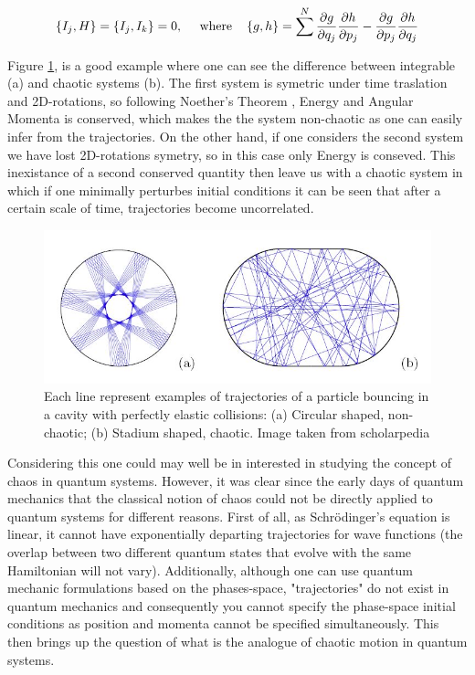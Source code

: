 \documentclass[11pt,a4paper]{article}
\begin{document}
\begin{equation}
    \left\{I_j,H\right\}=\left\{I_j,I_k\right\} = 0, ~~~~\text{where}~~~\left\{g,h\right\} = \sum^N\frac{\partial g}{\partial q_j}\frac{\partial h}{\partial p_j} - \frac{\partial g}{\partial p_j}\frac{\partial h}{\partial q_j}
\end{equation}

Figure \ref{Example_Chaos}, is a good example where one can see the difference between integrable (a) and chaotic systems (b). The first system is symetric under time traslation and 2D-rotations, so following Noether's Theorem \cite{Noether_1971}, Energy and Angular Momenta is conserved, which makes the the system non-chaotic as one can easily infer from the trajectories. On the other hand, if one considers the second system we have lost 2D-rotations symetry, so in this case only Energy is conseved. This inexistance of a second conserved quantity then leave us with a chaotic system in which if one minimally perturbes initial conditions it can be seen that after a certain scale of time, trajectories become uncorrelated.

\begin{figure}[ht]
    \centering
    \includegraphics[width=\linewidth]{figs/Stoe_billiards.jpg}
    \caption{Each line represent examples of trajectories of a particle bouncing in a cavity with perfectly elastic collisions: (a) Circular shaped, non-chaotic; (b) Stadium shaped, chaotic. Image taken from scholarpedia \cite{stockmann2010microwave}}
    \label{Example_Chaos}
\end{figure}

Considering this one could may well be in interested in studying the concept of chaos in quantum systems. However, it was clear since the early days of quantum mechanics that the classical notion of chaos could not be directly applied to quantum systems for different reasons. First of all, as Schrödinger's equation is linear, it cannot have exponentially departing trajectories for wave functions (the overlap between two different quantum states that evolve with the same Hamiltonian will not vary). Additionally, although one can use quantum mechanic formulations based on the phases-space, "trajectories" do not exist in quantum mechanics and consequently you cannot specify the phase-space initial conditions as position and momenta cannot be specified simultaneously. This then brings up the question of what is the analogue of chaotic motion in quantum systems.
\end{document}
